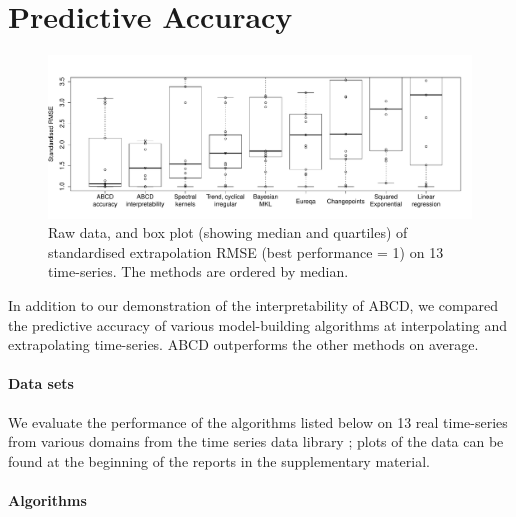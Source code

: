 \documentclass[letterpaper]{article}
\def\eg{e.g.\ }
\newcommand{\procedurename}{ABCD}
\renewcommand{\fTBD}[1]{}
\renewcommand{\NA}[1]{#1}  %
\begin{document}
\section{Predictive Accuracy}
\label{sec:numerical}

\begin{figure}[ht]
\centering
\includegraphics[width=\textwidth]{figures/box_extrap_wide}
\vspace{-0.8cm}
\caption{
Raw data, and box plot (showing median and quartiles) of standardised extrapolation RMSE (best performance = 1) on 13 time-series.
The methods are ordered by median.
}
\label{fig:box_extrap_dist}
\end{figure}

In addition to our demonstration of the interpretability of \procedurename{}, we compared the predictive accuracy of various model-building algorithms at interpolating and extrapolating time-series.
\procedurename{} outperforms the other methods on average.%

\paragraph{Data sets}

We evaluate the performance of the algorithms listed below on 13 real time-series from various domains from the time series data library \citep{TSDL}; plots of the data can be found at the beginning of the reports in the supplementary material.

\paragraph{Algorithms}
\end{document}
